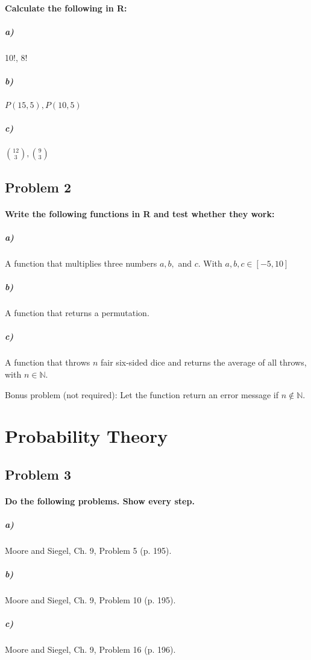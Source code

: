 \documentclass[12pt,letter]{article}
\begin{document}
\paragraph{Calculate the following in R:}

\subparagraph{a)} 10!, 8!

\subparagraph{b)} $P(15,5), P(10,5)$

\subparagraph{c)} $\binom{12}{3}, \binom{9}{3}$



\subsection*{Problem 2}

\paragraph{Write the following functions in R and test whether they work:}

\subparagraph{a)} A function that multiplies three numbers $a, b,$ and $c$. With $a, b, c \in [-5,10]$

\subparagraph{b)} A function that returns a permutation.

\subparagraph{c)} A function that throws $n$ fair six-sided dice and returns the average of all throws, with $n \in \mathbb{N}$.

Bonus problem (not required): Let the function return an error message if $n \notin \mathbb{N}$.



\section*{Probability Theory}

\subsection*{Problem 3}

\paragraph{Do the following problems. Show every step.}

\subparagraph{a)} Moore and Siegel, Ch. 9, Problem 5 (p. 195).

\subparagraph{b)} Moore and Siegel, Ch. 9, Problem 10 (p. 195).

\subparagraph{c)} Moore and Siegel, Ch. 9, Problem 16 (p. 196).
\end{document}
